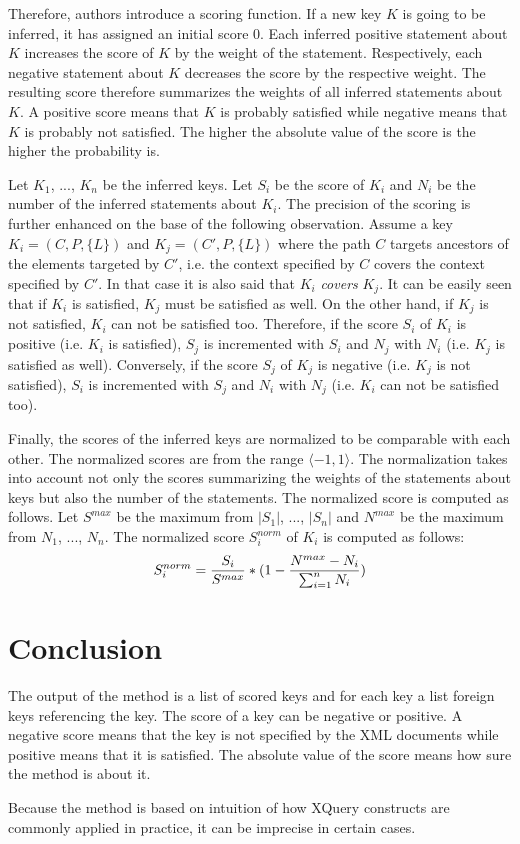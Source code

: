 Therefore, authors introduce a scoring function. If a new key $K$ is going to be inferred, it has assigned an initial score 0. Each inferred positive statement about $K$ increases the score of $K$ by the weight of the statement. Respectively, each negative statement about $K$ decreases the score by the respective weight. The resulting score therefore summarizes the weights of all inferred statements about $K$. A positive score means that $K$ is probably satisfied while negative means that $K$ is probably not satisfied. The higher the absolute value of the score is the higher the probability is.

Let $K_1$, ..., $K_n$ be the inferred keys. Let $S_i$ be the score of $K_i$ and $N_i$ be the number of the inferred statements about $K_i$. The precision of the scoring is further enhanced on the base of the following observation. Assume a key $K_i = (C, P, \{L\})$ and $K_j = (C' , P, \{L\})$ where the path $C$ targets ancestors of the elements targeted by $C'$, i.e. the context specified by $C$ covers the context specified by $C'$. In that case it is also said that $K_i$ \emph{covers} $K_j$. It can be easily seen that if $K_i$ is satisfied, $K_j$ must be satisfied as well. On the other hand, if $K_j$ is not satisfied, $K_i$ can not be satisfied too. Therefore, if the score $S_i$ of $K_i$ is positive (i.e. $K_i$ is satisfied), $S_j$ is incremented with $S_i$ and $N_j$ with $N_i$ (i.e. $K_j$ is satisfied as well). Conversely, if the score $S_j$ of $K_j$ is negative (i.e. $K_j$ is not satisfied), $S_i$ is incremented with $S_j$ and $N_i$ with $N_j$ (i.e. $K_i$ can not be satisfied too).

Finally, the scores of the inferred keys are normalized to be comparable with each other. The normalized scores are from the range $\langle -1, 1\rangle$. The normalization takes into account not only the scores summarizing the weights of the statements about keys but also the number of the statements. The normalized score is computed as follows. Let $S^{max}$ be the maximum from $|S_1|$, ..., $|S_n|$ and $N^{max}$ be the maximum from $N_1$, ..., $N_n$. The normalized score $S_i^{norm}$ of $K_i$ is computed as follows:
$$S_i^{norm} = {S_i \over S^{max}} * (1 - {N^{max} - N_i \over \sum _{i=1}^n N_i})$$

\section{Conclusion}
The output of the method is a list of scored keys and for each key a list foreign keys referencing the key. The score of a key can be negative or positive. A negative score means that the key is not specified by the XML documents while positive means that it is satisfied. The absolute value of the score means how sure the method is about it.

Because the method is based on intuition of how XQuery constructs are commonly applied in practice, it can be imprecise in certain cases.
